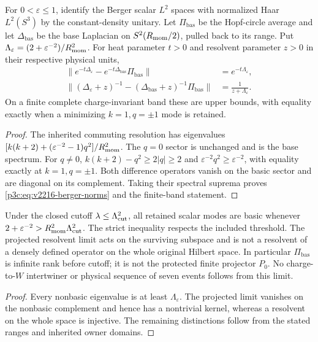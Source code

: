 \documentclass[12pt,a4paper]{article}
\begin{document}
\begin{theorem}
\label{p3c:thm:v2216-berger-norms}
For $0<\varepsilon\le1$, identify the Berger scalar $L^2$ spaces with
normalized Haar $L^2(S^3)$ by the constant-density unitary.  Let
$\Pi_{\mathrm{bas}}$ be the Hopf-circle average and let
$\Delta_{\mathrm{bas}}$ be the base Laplacian on $S^2(R_{\mathrm{mom}}/2)$,
pulled back to its range.  Put
$\Lambda_\varepsilon=(2+\varepsilon^{-2})/R_{\mathrm{mom}}^2$.
For heat parameter $t>0$ and resolvent parameter $z>0$ in their
respective physical units,
\begin{align}
 \|e^{-t\Delta_\varepsilon}
       -e^{-t\Delta_{\mathrm{bas}}}\Pi_{\mathrm{bas}}\|
 &=e^{-t\Lambda_\varepsilon},\nonumber\\
 \|(\Delta_\varepsilon+z)^{-1}
       -(\Delta_{\mathrm{bas}}+z)^{-1}\Pi_{\mathrm{bas}}\|
 &=\frac1{z+\Lambda_\varepsilon}.
 \label{p3c:eq:v2216-berger-norms}
\end{align}
On a finite complete charge-invariant band these are upper bounds,
with equality exactly when a minimizing $k=1,q=\pm1$ mode is retained.
\end{theorem}
\begin{proof}
The inherited commuting resolution has eigenvalues
$[k(k+2)+(\varepsilon^{-2}-1)q^2]/R_{\mathrm{mom}}^2$.
The $q=0$ sector is unchanged and is the base spectrum.  For $q\ne0$,
$k(k+2)-q^2\ge2|q|\ge2$ and
$\varepsilon^{-2}q^2\ge\varepsilon^{-2}$, with equality exactly
at $k=1,q=\pm1$.  Both difference operators vanish on the basic
sector and are diagonal on its complement.  Taking their spectral
suprema proves \eqref{p3c:eq:v2216-berger-norms} and the finite-band
statement.
\end{proof}

\begin{corollary}
\label{p3c:cor:v2216-berger-cutoff}
Under the closed cutoff $\lambda\le\Lambda_{\mathrm{cut}}^2$, all retained scalar
modes are basic whenever $2+\varepsilon^{-2}>R_{\mathrm{mom}}^2\Lambda_{\mathrm{cut}}^2$.
The strict inequality respects the included threshold.  The projected
resolvent limit acts on the surviving subspace and is not a resolvent
of a densely defined operator on the whole original Hilbert space.
In particular $\Pi_{\mathrm{bas}}$ is infinite rank before cutoff;
it is not the protected finite projector $P_0$.  No charge-to-$W$
intertwiner or physical sequence of seven events follows from this limit.
\end{corollary}
\begin{proof}
Every nonbasic eigenvalue is at least $\Lambda_\varepsilon$.
The projected limit vanishes on the nonbasic complement and hence has
a nontrivial kernel, whereas a resolvent on the whole space is injective.
The remaining distinctions follow from the stated ranges and inherited
owner domains.
\end{proof}
\end{document}
